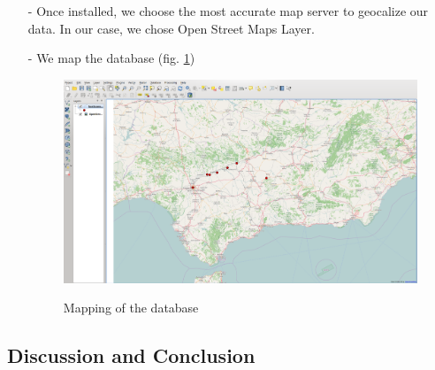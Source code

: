\documentclass[10pt,a4paper]{article}
\begin{document}
\begin{itemize}
\item[-] Once installed, we choose the most accurate map server to geocalize our data. In our case, we chose Open Street Maps Layer. 
\item[-] We map the database (fig. \ref{gismap})

\begin{figure}[hdp]
\centering
\includegraphics[scale=0.50]{gismap.png}
\label{gismap}
\caption{Mapping of the database}
\end{figure}

\end{itemize}

\subsection{Discussion and Conclusion}







































 
\end{document}
